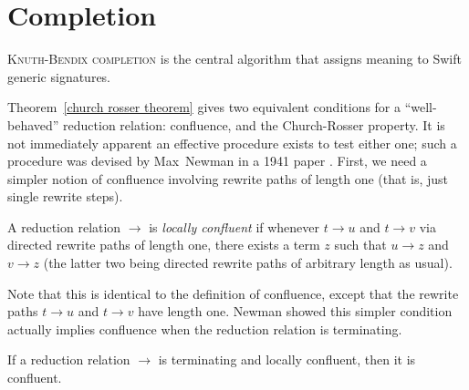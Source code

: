 \documentclass[../generics]{subfiles}
\begin{document}
\chapter{Completion}\label{completion}

%
\lettrine{K}{nuth-Bendix completion} is the central algorithm that assigns meaning to Swift generic signatures.

Theorem~\ref{church rosser theorem} gives two equivalent conditions for a ``well-behaved'' reduction relation: confluence, and the Church-Rosser property. It is not immediately apparent an effective procedure exists to test either one; such a procedure was devised by Max~Newman in a 1941 paper \cite{newman}. First, we need a simpler notion of confluence involving rewrite paths of length one (that is, just single rewrite steps).
\begin{definition}
A reduction relation $\rightarrow$ is \emph{locally confluent} if whenever $t\rightarrow u$ and $t\rightarrow v$ via directed rewrite paths of length one, there exists a term $z$ such that $u\rightarrow z$ and $v\rightarrow z$ (the latter two being directed rewrite paths of arbitrary length as usual).
\end{definition}
Note that this is identical to the definition of confluence, except that the rewrite paths $t\rightarrow u$ and $t\rightarrow v$ have length one. Newman showed this simpler condition actually implies confluence when the reduction relation is terminating.
\begin{theorem}
If a reduction relation $\rightarrow$ is terminating and locally confluent, then it is confluent.
\end{theorem}
\end{document}
